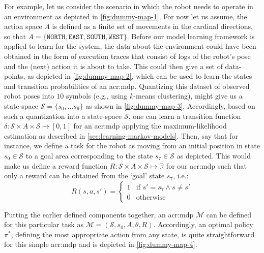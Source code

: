 For example, let us consider the scenario in which the robot needs to operate in an environment as depicted in \autoref{fig:dummy-map-1}.
For now let us assume, the action space $A$ is defined as a finite set of movements in the cardinal directions, so that $A = \{\texttt{NORTH}, \texttt{EAST}, \texttt{SOUTH}, \texttt{WEST}\}$.
Before our model learning framework is applied to learn  for the system, the data about the environment could have been obtained in the form of execution traces that consist of logs of the robot's pose and the (next) action it is about to take.
This could then give a set of data-points, as depicted in \autoref{fig:dummy-map-2}, which can be used to learn the states and transition probabilities of an \acrshort{acr:mdp}.
Quantizing this dataset of observed robot poses into $10$ symbols (e.g., using $k$-means clustering), might give us a state-space $\mathcal{S} = \{s_0, \ldots s_9\}$ as shown in \autoref{fig:dummy-map-3}.
Accordingly, based on such a quantization into a state-space $\mathcal{S}$, one can learn a transition function $\delta: \mathcal{S} \times A \times \mathcal{S} \mapsto [0, 1]$ for an \acrshort{acr:mdp} applying the maximum-likelihood estimation as described in \autoref{sec:learning-markov-models}.
Then, say that for instance, we define a task for the robot as moving from an initial position in state $s_0 \in \mathcal{S}$ to a goal area corresponding to the state $s_7 \in \mathcal{S}$ as depicted.
This would make us define a reward function $R: \mathcal{S} \times A \times \mathcal{S} \mapsto \mathbb{R}$ for our \acrshort{acr:mdp} such that only a reward can be obtained from the `goal' state $s_7$, i.e.:
\[
R(s, a, s') = 
\begin{cases}
	1 & \text{if } s' = s_7 \land s \neq s'\\
	0 & \text{otherwise}
\end{cases}
\]

Putting the earlier defined components together, an \acrshort{acr:mdp} $\mathcal{M}$ can be defined for this particular task as $\mathcal{M} = (\mathcal{S}, s_0, A, \theta, R)$.
Accordingly, an optimal policy $\pi^\ast$, defining the most appropriate action from any state, is quite straightforward for this simple \acrshort{acr:mdp} and is depicted in \autoref{fig:dummy-map-4}.

